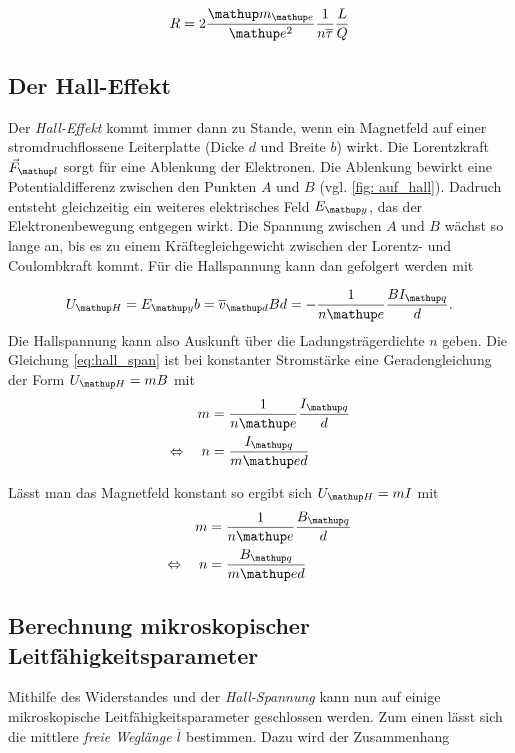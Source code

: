 \begin{equation}
\label{eq:wider}
R=2\frac{\map{m}\ua{e}}{\map{e}^2}\frac{1}{n\overline{\tau}}\frac{L}{Q}
\end{equation}

\subsection{Der Hall-Effekt}
Der \emph{Hall-Effekt} kommt immer dann zu Stande, wenn %
ein Magnetfeld auf einer stromdruchflossene %
Leiterplatte (Dicke $d$ und Breite $b$) wirkt.
Die Lorentzkraft $\vec{F}\ua{l}$ sorgt für eine Ablenkung der Elektronen.
Die Ablenkung bewirkt eine Potentialdifferenz zwischen den
Punkten $A$ und $B$ (vgl. \ref{fig: auf_hall}). Dadruch entsteht gleichzeitig ein %
weiteres elektrisches Feld $E\ua{y}$, das der Elektronenbewegung entgegen wirkt. %
Die Spannung zwischen $A$ und $B$ wächst so lange an, bis es zu einem Kräftegleichgewicht zwischen der Lorentz- und Coulombkraft kommt.
Für die Hallspannung kann dan gefolgert werden mit%

\begin{equation}
\label{eq:hall_span}
U\ua{H}=E\ua{y}b=\overline{v}\ua{d}Bd=-\frac{1}{n\map{e}}\frac{BI\ua{q}}{d}.
\end{equation}
Die Hallspannung kann also Auskunft über die Ladungsträgerdichte $n$ geben.
Die Gleichung \eqref{eq:hall_span} ist bei konstanter Stromstärke eine Geradengleichung der Form $U\ua{H}=mB$ mit %
\begin{align}
m&=\frac{1}{n\map{e}}\frac{I\ua{q}}{d} \notag \\
\Leftrightarrow \quad n&=\frac{I\ua{q}}{m\map{e}d}\label{eq:steig_teil_anz}
\end{align}

Lässt man das Magnetfeld konstant so ergibt sich $U\ua{H}=mI$ mit
\begin{align}
m&=\frac{1}{n\map{e}}\frac{B\ua{q}}{d} \notag \\
\Leftrightarrow \quad n&=\frac{B\ua{q}}{m\map{e}d}\label{eq:steig_teil_anz_konstb}
\end{align}


\subsection{Berechnung mikroskopischer Leitfähigkeitsparameter}
Mithilfe des Widerstandes und der \emph{Hall-Spannung} kann nun auf
einige mikroskopische Leitfähigkeitsparameter geschlossen werden.
Zum einen lässt sich die mittlere \emph{freie Weglänge} $\overline{l}$ bestimmen.
Dazu wird der Zusammenhang

